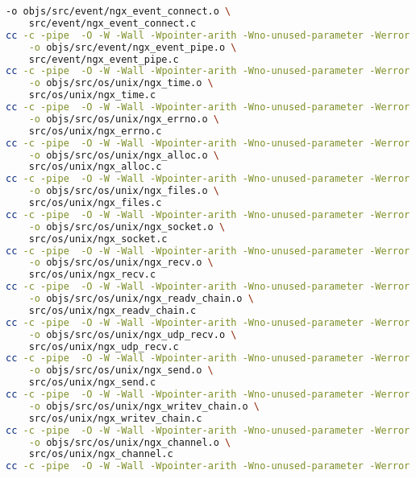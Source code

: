 \begin{lstlisting}[language=bash]
	-o objs/src/event/ngx_event_connect.o \
	src/event/ngx_event_connect.c
cc -c -pipe  -O -W -Wall -Wpointer-arith -Wno-unused-parameter -Werror -g  -I src/core -I src/event -I src/event/modules -I src/os/unix -I objs \
	-o objs/src/event/ngx_event_pipe.o \
	src/event/ngx_event_pipe.c
cc -c -pipe  -O -W -Wall -Wpointer-arith -Wno-unused-parameter -Werror -g  -I src/core -I src/event -I src/event/modules -I src/os/unix -I objs \
	-o objs/src/os/unix/ngx_time.o \
	src/os/unix/ngx_time.c
cc -c -pipe  -O -W -Wall -Wpointer-arith -Wno-unused-parameter -Werror -g  -I src/core -I src/event -I src/event/modules -I src/os/unix -I objs \
	-o objs/src/os/unix/ngx_errno.o \
	src/os/unix/ngx_errno.c
cc -c -pipe  -O -W -Wall -Wpointer-arith -Wno-unused-parameter -Werror -g  -I src/core -I src/event -I src/event/modules -I src/os/unix -I objs \
	-o objs/src/os/unix/ngx_alloc.o \
	src/os/unix/ngx_alloc.c
cc -c -pipe  -O -W -Wall -Wpointer-arith -Wno-unused-parameter -Werror -g  -I src/core -I src/event -I src/event/modules -I src/os/unix -I objs \
	-o objs/src/os/unix/ngx_files.o \
	src/os/unix/ngx_files.c
cc -c -pipe  -O -W -Wall -Wpointer-arith -Wno-unused-parameter -Werror -g  -I src/core -I src/event -I src/event/modules -I src/os/unix -I objs \
	-o objs/src/os/unix/ngx_socket.o \
	src/os/unix/ngx_socket.c
cc -c -pipe  -O -W -Wall -Wpointer-arith -Wno-unused-parameter -Werror -g  -I src/core -I src/event -I src/event/modules -I src/os/unix -I objs \
	-o objs/src/os/unix/ngx_recv.o \
	src/os/unix/ngx_recv.c
cc -c -pipe  -O -W -Wall -Wpointer-arith -Wno-unused-parameter -Werror -g  -I src/core -I src/event -I src/event/modules -I src/os/unix -I objs \
	-o objs/src/os/unix/ngx_readv_chain.o \
	src/os/unix/ngx_readv_chain.c
cc -c -pipe  -O -W -Wall -Wpointer-arith -Wno-unused-parameter -Werror -g  -I src/core -I src/event -I src/event/modules -I src/os/unix -I objs \
	-o objs/src/os/unix/ngx_udp_recv.o \
	src/os/unix/ngx_udp_recv.c
cc -c -pipe  -O -W -Wall -Wpointer-arith -Wno-unused-parameter -Werror -g  -I src/core -I src/event -I src/event/modules -I src/os/unix -I objs \
	-o objs/src/os/unix/ngx_send.o \
	src/os/unix/ngx_send.c
cc -c -pipe  -O -W -Wall -Wpointer-arith -Wno-unused-parameter -Werror -g  -I src/core -I src/event -I src/event/modules -I src/os/unix -I objs \
	-o objs/src/os/unix/ngx_writev_chain.o \
	src/os/unix/ngx_writev_chain.c
cc -c -pipe  -O -W -Wall -Wpointer-arith -Wno-unused-parameter -Werror -g  -I src/core -I src/event -I src/event/modules -I src/os/unix -I objs \
	-o objs/src/os/unix/ngx_channel.o \
	src/os/unix/ngx_channel.c
cc -c -pipe  -O -W -Wall -Wpointer-arith -Wno-unused-parameter -Werror -g  -I src/core -I src/event -I src/event/modules -I src/os/unix -I objs \

\end{lstlisting}
